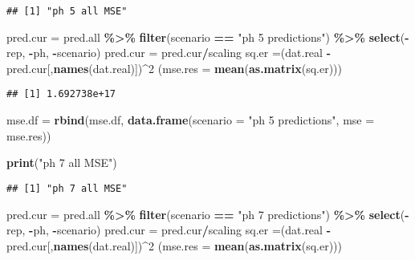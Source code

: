 \documentclass[
]{article}
\newenvironment{Shaded}{\begin{snugshade}}{\end{snugshade}}
\newcommand{\AttributeTok}[1]{\textcolor[rgb]{0.13,0.29,0.53}{#1}}
\newcommand{\DecValTok}[1]{\textcolor[rgb]{0.00,0.00,0.81}{#1}}
\newcommand{\FunctionTok}[1]{\textcolor[rgb]{0.13,0.29,0.53}{\textbf{#1}}}
\newcommand{\NormalTok}[1]{#1}
\newcommand{\OtherTok}[1]{\textcolor[rgb]{0.56,0.35,0.01}{#1}}
\newcommand{\SpecialCharTok}[1]{\textcolor[rgb]{0.81,0.36,0.00}{\textbf{#1}}}
\newcommand{\StringTok}[1]{\textcolor[rgb]{0.31,0.60,0.02}{#1}}
\begin{document}
\begin{verbatim}
## [1] "ph 5 all MSE"
\end{verbatim}

\begin{Shaded}
\begin{Highlighting}[]
\NormalTok{pred.cur }\OtherTok{=}\NormalTok{ pred.all }\SpecialCharTok{\%\textgreater{}\%} 
  \FunctionTok{filter}\NormalTok{(scenario }\SpecialCharTok{==} \StringTok{"ph 5 predictions"}\NormalTok{) }\SpecialCharTok{\%\textgreater{}\%} 
  \FunctionTok{select}\NormalTok{(}\SpecialCharTok{{-}}\NormalTok{rep, }\SpecialCharTok{{-}}\NormalTok{ph, }\SpecialCharTok{{-}}\NormalTok{scenario)}
\NormalTok{pred.cur }\OtherTok{=}\NormalTok{ pred.cur}\SpecialCharTok{/}\NormalTok{scaling}
\NormalTok{sq.er }\OtherTok{=}\NormalTok{(dat.real }\SpecialCharTok{{-}}\NormalTok{ pred.cur[,}\FunctionTok{names}\NormalTok{(dat.real)])}\SpecialCharTok{\^{}}\DecValTok{2}
\NormalTok{(}\AttributeTok{mse.res =} \FunctionTok{mean}\NormalTok{(}\FunctionTok{as.matrix}\NormalTok{(sq.er)))}
\end{Highlighting}
\end{Shaded}

\begin{verbatim}
## [1] 1.692738e+17
\end{verbatim}

\begin{Shaded}
\begin{Highlighting}[]
\NormalTok{mse.df }\OtherTok{=} \FunctionTok{rbind}\NormalTok{(mse.df, }\FunctionTok{data.frame}\NormalTok{(}\AttributeTok{scenario =} \StringTok{"ph 5 predictions"}\NormalTok{,}
                                  \AttributeTok{mse =}\NormalTok{ mse.res))}

\FunctionTok{print}\NormalTok{(}\StringTok{"ph 7 all MSE"}\NormalTok{)}
\end{Highlighting}
\end{Shaded}

\begin{verbatim}
## [1] "ph 7 all MSE"
\end{verbatim}

\begin{Shaded}
\begin{Highlighting}[]
\NormalTok{pred.cur }\OtherTok{=}\NormalTok{ pred.all }\SpecialCharTok{\%\textgreater{}\%} 
  \FunctionTok{filter}\NormalTok{(scenario }\SpecialCharTok{==} \StringTok{"ph 7 predictions"}\NormalTok{)  }\SpecialCharTok{\%\textgreater{}\%} 
  \FunctionTok{select}\NormalTok{(}\SpecialCharTok{{-}}\NormalTok{rep, }\SpecialCharTok{{-}}\NormalTok{ph, }\SpecialCharTok{{-}}\NormalTok{scenario)}
\NormalTok{pred.cur }\OtherTok{=}\NormalTok{ pred.cur}\SpecialCharTok{/}\NormalTok{scaling}
\NormalTok{sq.er }\OtherTok{=}\NormalTok{(dat.real }\SpecialCharTok{{-}}\NormalTok{ pred.cur[,}\FunctionTok{names}\NormalTok{(dat.real)])}\SpecialCharTok{\^{}}\DecValTok{2}
\NormalTok{(}\AttributeTok{mse.res =} \FunctionTok{mean}\NormalTok{(}\FunctionTok{as.matrix}\NormalTok{(sq.er)))}
\end{Highlighting}
\end{Shaded}
\end{document}
